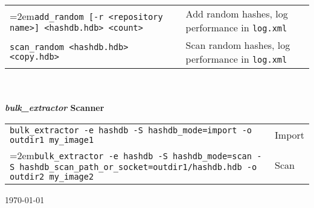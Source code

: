 \documentclass[12pt]{article}
\newcommand{\bulk}{\emph{bulk\_extractor}\xspace}
\begin{document}
\begin{tabular}{p{4.0 in} l}
\hangindent=2em\texttt{add\_random [-r <repository name>] <hashdb.hdb> <count>} & Add random hashes, log performance in \texttt{log.xml}\\
\texttt{scan\_random <hashdb.hdb> <copy.hdb>} & Scan random hashes, log performance in \texttt{log.xml}\\
\end{tabular}
\\
\\
\textbf{\bulk Scanner}\\
\begin{tabular}{p{6.0 in} l}
\texttt{bulk\_extractor -e hashdb -S hashdb\_mode=import -o outdir1 my\_image1} & Import \\
\hangindent=2em\texttt{bulk\_extractor -e hashdb -S hashdb\_mode=scan -S hashdb\_scan\_path\_or\_socket=outdir1/hashdb.hdb -o outdir2 my\_image2} & Scan \\
\end{tabular}

\vspace{2mm}
\begin{center}
\begin{footnotesize}
\today
\end{footnotesize}
\end{center}
\end{document}
